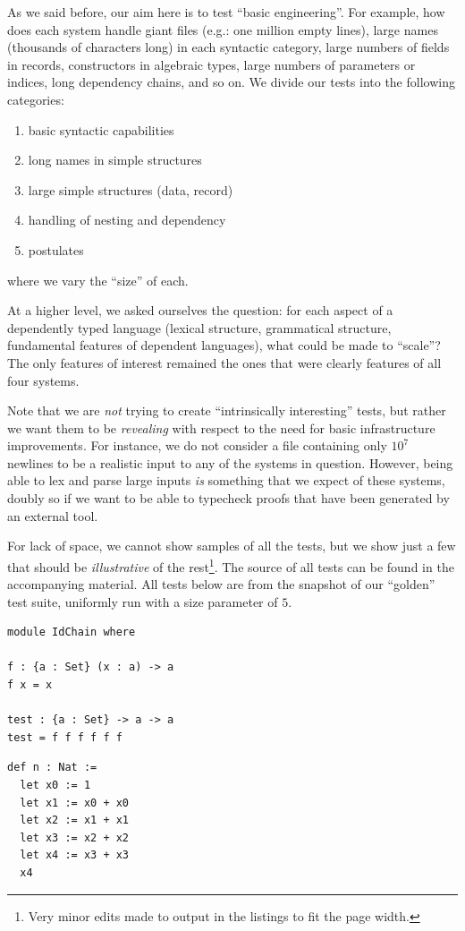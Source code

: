 \documentclass[a4paper,UKenglish,cleveref, autoref, thm-restate,anonymous]{lipics-v2021}
\begin{document}
As we said before, our aim here is to test ``basic engineering''.  For example,
how does each system handle giant files (e.g.: one million empty lines),
large names (thousands of characters long) in each syntactic category,
large numbers of fields in records, constructors in algebraic types, large
numbers of parameters or indices, long dependency chains, and so on. We
divide our tests into the following categories:
\begin{enumerate}
\item basic syntactic capabilities
\item long names in simple structures
\item large simple structures (data, record)
\item handling of nesting and dependency
\item postulates
\end{enumerate}
\noindent where we vary the ``size'' of each.

At a higher level, we asked ourselves the question: for each aspect of a
dependently typed language (lexical structure, grammatical structure,
fundamental features of dependent languages), what could be made to ``scale''?
The only features of interest remained the ones that were clearly features of
all four systems.

Note that we are \emph{not} trying to create ``intrinsically interesting'' tests,
but rather we want them to be \emph{revealing} with respect to the need for
basic infrastructure improvements. For instance, we do not consider a file
containing only \(10^{7}\) newlines to be a realistic input to any of the
systems in question. However, being able to lex and parse large inputs \emph{is}
something that we expect of these systems, doubly so if we want to be able to
typecheck proofs that have been generated by an external tool.

For lack of space, we cannot show samples of all the tests, but we show
just a few that should be \emph{illustrative} of the rest\footnote{Very minor
edits made to \panbench output in the listings to fit the page width.}. The source of
all tests can be found in the accompanying material. All tests below
are from the snapshot of our ``golden'' test suite, uniformly run with a
size parameter of \(5\).

\begin{minipage}{0.50\textwidth}
\begin{lstlisting}[style=agda,caption=Nesting: Id chain (Agda),label=code:IdChain]
module IdChain where

f : {a : Set} (x : a) -> a
f x = x

test : {a : Set} -> a -> a
test = f f f f f f
\end{lstlisting}
\end{minipage}
\begin{minipage}{0.50\textwidth}
\begin{lstlisting}[style=lean,caption=Nesting: Let add (Lean),label=code:LetAdd]
def n : Nat :=
  let x0 := 1
  let x1 := x0 + x0
  let x2 := x1 + x1
  let x3 := x2 + x2
  let x4 := x3 + x3
  x4
\end{lstlisting}
\end{minipage}
\end{document}
